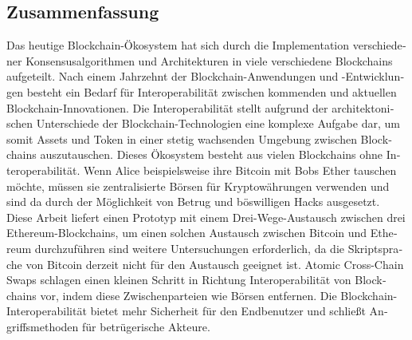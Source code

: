 \begin{otherlanguage}{ngerman}
	\chapter*{Zusammenfassung}
	Das heutige Blockchain-Ökosystem hat sich durch die Implementation verschiedener Konsensusalgorithmen und Architekturen in viele verschiedene Blockchains aufgeteilt. Nach einem Jahrzehnt der Blockchain-Anwendungen und -Entwicklungen besteht ein Bedarf für Interoperabilität zwischen kommenden und aktuellen Blockchain-Innovationen. Die Interoperabilität stellt aufgrund der architektonischen Unterschiede der Blockchain-Technologien eine komplexe Aufgabe dar, um somit Assets und Token in einer stetig wachsenden Umgebung zwischen Blockchains auszutauschen. Dieses Ökosystem besteht aus vielen Blockchains ohne Interoperabilität. Wenn Alice beispielsweise ihre Bitcoin mit Bobs Ether tauschen möchte, müssen sie zentralisierte Börsen für Kryptowährungen verwenden und sind da durch der Möglichkeit von Betrug und böswilligen Hacks ausgesetzt. Diese Arbeit liefert einen Prototyp mit einem Drei-Wege-Austausch zwischen drei Ethereum-Blockchains, um einen solchen Austausch zwischen Bitcoin und Ethereum durchzuführen sind weitere Untersuchungen erforderlich, da die Skriptsprache von Bitcoin derzeit nicht für den Austausch geeignet ist. Atomic Cross-Chain Swaps schlagen einen kleinen Schritt in Richtung Interoperabilität von Blockchains vor, indem diese Zwischenparteien wie Börsen entfernen. Die Blockchain-Interoperabilität bietet mehr Sicherheit für den Endbenutzer und schließt Angriffsmethoden für betrügerische Akteure.
\end{otherlanguage}
